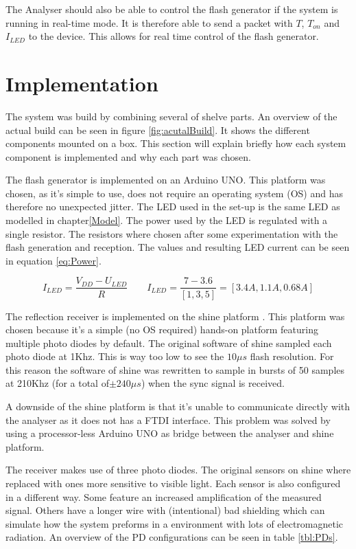 The Analyser should also be able to control the flash generator if the system is running in real-time mode. It is therefore able to send a packet with $T$, ${T_{on}}$ and $I_{LED}$ to the device. This allows for real time control of the flash generator.

\section{Implementation}
The system was build by combining several of shelve parts. An overview of the actual build can be seen in figure \ref{fig:acutalBuild}. It shows the different components mounted on a box. This section will explain briefly how each system component is implemented and why each part was chosen.

The flash generator is implemented on an Arduino UNO\cite{ArduinoUno}. This platform was chosen, as it's simple to use, does not require an operating system (OS) and has therefore no unexpected jitter. The LED used in the set-up is the same LED as modelled in chapter\ref{Model}. The power used by the LED is regulated with a single resistor. The resistors where chosen after some experimentation with the flash generation and reception. The values and resulting LED current can be seen in equation \ref{eq:Power}.

\begin{equation}
\label{eq:Power}
I_{LED}=\frac{V_{DD} - U_{LED}}{R}
\qquad
I_{LED} = \frac{7 - 3.6}{[1, 3, 5]} = [3.4A, 1.1A, 0.68A]
\end{equation}

The reflection receiver is implemented on the shine platform \cite{Shine}. This platform was chosen because it's a simple (no OS required) hands-on platform featuring multiple photo diodes by default. The original software of shine sampled each photo diode at 1Khz. This is way too low to see the $10\mu s$ flash resolution. For this reason the software of shine was rewritten to sample in bursts of 50 samples at 210Khz (for a total of$\pm 240\mu s$) when the sync signal is received.

A downside of the shine platform is that it's unable to communicate directly with the analyser as it does not has a FTDI interface. This problem was solved by using a processor-less Arduino UNO as bridge between the analyser and shine platform.

The receiver makes use of three photo diodes. The original sensors on shine where replaced with ones more sensitive to visible light. Each sensor is also configured in a different way. Some feature an increased amplification of the measured signal. Others have a longer wire with (intentional) bad shielding which can simulate how the system preforms in a environment with lots of electromagnetic radiation. An overview of the PD configurations can be seen in table \ref{tbl:PDs}.

